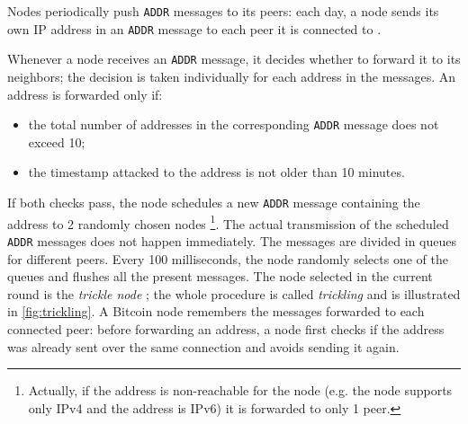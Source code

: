 Nodes periodically push \texttt{ADDR} messages to its peers:
each day, a node sends its own IP address in an \texttt{ADDR} message to each peer it is connected to \cite{eclipse_attack_2015}.

Whenever a node receives an \texttt{ADDR} message, it decides whether to forward it to its neighbors;
the decision is taken individually for each address in the messages.
An address is forwarded only if:
\begin{itemize}
	\item the total number of addresses in the corresponding \texttt{ADDR} message does not exceed \num{10};
	\item the timestamp attacked to the address is not older than \num{10} minutes.
\end{itemize}
If both checks pass, the node schedules a new \texttt{ADDR} message containing the address to \num{2} randomly chosen nodes \footnote{Actually, if the address is non-reachable for the node (e.g. the node supports only IPv4 and the address is IPv6) it is forwarded to only \num{1} peer.}.
The actual transmission of the scheduled \texttt{ADDR} messages does not happen immediately.
The messages are divided in queues for different peers.
Every \num{100} milliseconds, the node randomly selects one of the queues and flushes all the present messages.
The node selected in the current round is the \textit{trickle node} \cite{deanonymisation_2014}; the whole procedure is called \textit{trickling} and is illustrated in \cref{fig:trickling}.
A Bitcoin node remembers the messages forwarded to each connected peer:
before forwarding an address, a node first checks if the address was already sent over the same connection and avoids sending it again.

